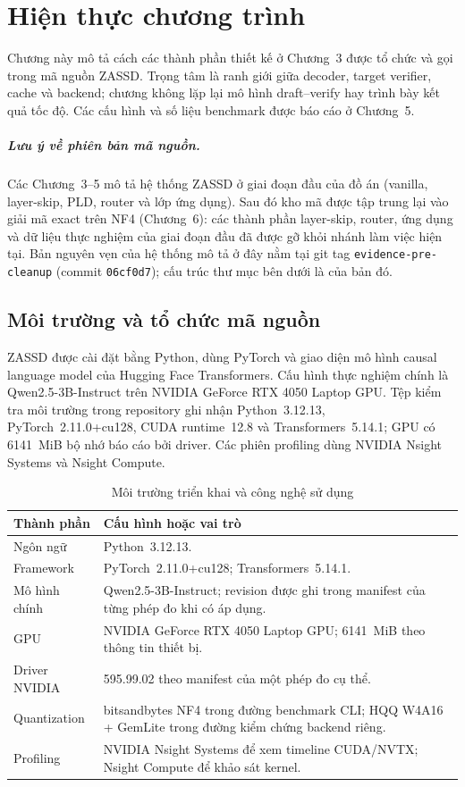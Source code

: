 \chapter{Hiện thực chương trình}

Chương này mô tả cách các thành phần thiết kế ở Chương~3 được tổ chức và gọi trong mã nguồn ZASSD. Trọng tâm là ranh giới giữa decoder, target verifier, cache và backend; chương không lặp lại mô hình draft--verify hay trình bày kết quả tốc độ. Các cấu hình và số liệu benchmark được báo cáo ở Chương~5.

\paragraph{Lưu ý về phiên bản mã nguồn.} Các Chương~3--5 mô tả hệ thống ZASSD ở giai đoạn đầu của đồ án (vanilla, layer-skip, PLD, router và lớp ứng dụng). Sau đó kho mã được tập trung lại vào giải mã exact trên NF4 (Chương~6): các thành phần layer-skip, router, ứng dụng và dữ liệu thực nghiệm của giai đoạn đầu đã được gỡ khỏi nhánh làm việc hiện tại. Bản nguyên vẹn của hệ thống mô tả ở đây nằm tại git tag \texttt{evidence-pre-cleanup} (commit \texttt{06cf0d7}); cấu trúc thư mục bên dưới là của bản đó.

\section{Môi trường và tổ chức mã nguồn}

ZASSD được cài đặt bằng Python, dùng PyTorch và giao diện mô hình causal language model của Hugging Face Transformers. Cấu hình thực nghiệm chính là Qwen2.5-3B-Instruct trên NVIDIA GeForce RTX 4050 Laptop GPU. Tệp kiểm tra môi trường trong repository ghi nhận Python~3.12.13, PyTorch~2.11.0+cu128, CUDA runtime~12.8 và Transformers~5.14.1; GPU có 6141~MiB bộ nhớ báo cáo bởi driver. Các phiên profiling dùng NVIDIA Nsight Systems và Nsight Compute.

\begin{table}[H]
\centering
\caption{Môi trường triển khai và công nghệ sử dụng}
\label{tab:implementation-environment}
\begin{tabularx}{0.96\textwidth}{@{}p{3.5cm}X@{}}
\toprule
\textbf{Thành phần} & \textbf{Cấu hình hoặc vai trò} \\
\midrule
Ngôn ngữ & Python~3.12.13. \\
Framework & PyTorch~2.11.0+cu128; Transformers~5.14.1. \\
Mô hình chính & Qwen2.5-3B-Instruct; revision được ghi trong manifest của từng phép đo khi có áp dụng. \\
GPU & NVIDIA GeForce RTX 4050 Laptop GPU; 6141~MiB theo thông tin thiết bị. \\
Driver NVIDIA & 595.99.02 theo manifest của một phép đo cụ thể. \\
Quantization & bitsandbytes NF4 trong đường benchmark CLI; HQQ W4A16 + GemLite trong đường kiểm chứng backend riêng. \\
Profiling & NVIDIA Nsight Systems để xem timeline CUDA/NVTX; Nsight Compute để khảo sát kernel. \\
\bottomrule
\end{tabularx}
\end{table}


